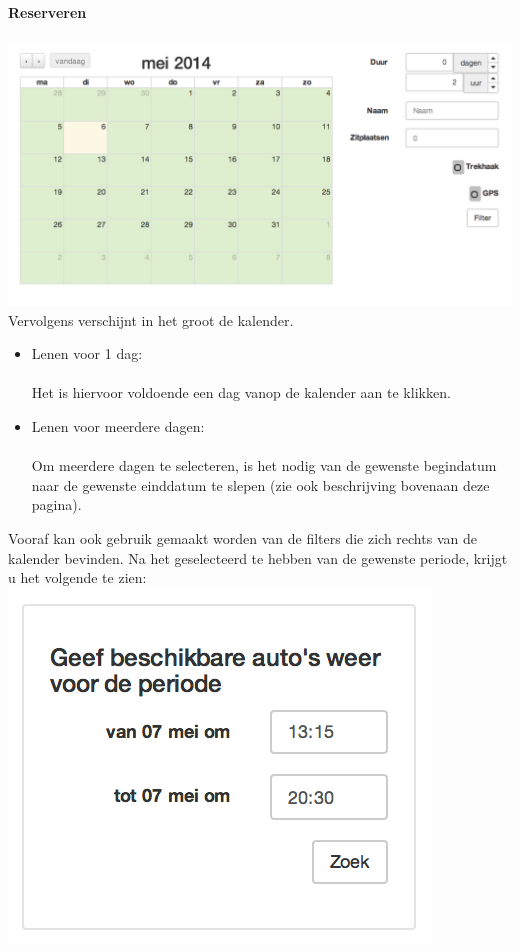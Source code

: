 \documentclass[11pt,a4paper,oneside]{article}
\begin{document}
{\large{\textbf{Reserveren}}} \\\\
\includegraphics[scale=0.75]{img/kalender}
Vervolgens verschijnt in het groot de kalender.
\begin{itemize}
\item Lenen voor 1 dag: \\\\
Het is hiervoor voldoende een dag vanop de kalender aan te klikken.
\item Lenen voor meerdere dagen: \\\\
Om meerdere dagen te selecteren, is het nodig van de gewenste begindatum naar de gewenste einddatum te slepen (zie ook beschrijving bovenaan deze pagina).
\end{itemize}
Vooraf kan ook gebruik gemaakt worden van de filters die zich rechts van de kalender bevinden. Na het geselecteerd te hebben van de gewenste periode, krijgt u het volgende te zien:
\includegraphics[scale=0.75]{img/zoeken} \\
\end{document}
